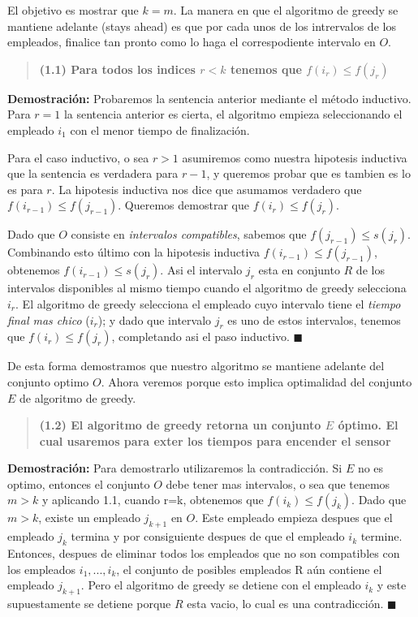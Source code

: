 \documentclass{article}
\begin{document}
El objetivo es mostrar que \(k=m\). 
La manera en que el algoritmo de greedy se mantiene adelante (stays ahead) es que por cada unos de los intrervalos de los empleados, 
finalice tan pronto como lo haga el correspodiente intervalo en \(O\).

\begin{quote}
    \textbf{(1.1) Para todos los indices \(r<k\) tenemos que \(f(i_r) \leq f(j_r)\)}
\end{quote}

\textbf{Demostración:}  Probaremos la sentencia anterior mediante el método inductivo. 
Para \(r=1\) la sentencia anterior es cierta, el algoritmo empieza seleccionando el empleado \(i_1\) con el menor tiempo de finalización.

Para el caso inductivo, o sea \(r>1\) asumiremos como nuestra hipotesis inductiva que la sentencia es verdadera para \(r-1\), y queremos probar que es tambien es lo es para \(r\). 
La hipotesis inductiva nos dice que asumamos verdadero que \(f(i_{r-1}) \leq f(j_{r-1})\). Queremos demostrar que \(f(i_{r}) \leq f(j_{r})\).

Dado que \(O\) consiste en \textit{intervalos compatibles}, sabemos que \(f(j_{r-1}) \leq s(j_r)\). Combinando esto último con la hipotesis inductiva \(f(i_{r-1}) \leq f(j_{r-1})\), obtenemos \(f(i_{r-1}) \leq s(j_{r})\). 
Asi el intervalo \(j_r\) esta en conjunto \(R\) de los intervalos disponibles al mismo tiempo cuando el algoritmo de greedy selecciona \(i_r\).
El algoritmo de greedy selecciona el empleado cuyo intervalo tiene el \textit{tiempo final mas chico} (\(i_{r}\)); y dado que intervalo \(j_{r}\) es uno de estos intervalos, tenemos que \(f(i_r) \leq f(j_r)\), completando asi el paso inductivo. \(\blacksquare\)

De esta forma demostramos que nuestro algoritmo se mantiene adelante del conjunto optimo \(O\). Ahora veremos porque esto implica optimalidad del conjunto \(E\) de algoritmo de greedy.

\begin{quote}
    \textbf{(1.2) El algoritmo de greedy retorna un conjunto \(E\) óptimo. El cual usaremos para exter los tiempos para encender el sensor}
\end{quote}

\textbf{Demostración:} Para demostrarlo utilizaremos la contradicción. Si \(E\) no es optimo, entonces el conjunto \(O\) debe tener mas intervalos, o sea que tenemos \(m>k\) y aplicando 1.1, cuando r=k, 
obtenemos que \(f(i_k) \leq f(j_k)\). Dado que \(m>k\), existe un empleado \(j_{k+1}\) en \(O\). Este empleado empieza despues que el empleado \(j_k\) termina y por consiguiente despues de que el empleado \(i_k\) termine.
Entonces, despues de eliminar todos los empleados que no son compatibles con los empleados \(i_1,...,i_k\), el conjunto de posibles empleados R aún contiene el empleado \(j_{k+1}\). 
Pero el algoritmo de greedy se detiene con el empleado \(i_k\) y este supuestamente se detiene porque \(R\) esta vacio, lo cual es una contradicción. \(\blacksquare\)
\end{document}
